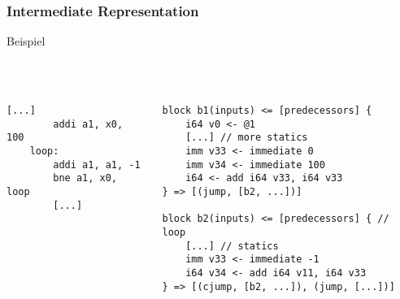 \begin{frame}[fragile]
    \frametitle{Intermediate Representation}{Beispiel}
    \pause
    ~\\
    ~\\
    ~\\
    \begin{columns}[c]
        \begin{lstlisting}[language=rv64]
        [...]
        addi a1, x0, 100
    loop:
        addi a1, a1, -1
        bne a1, x0, loop
        [...]
        \end{lstlisting}

        \pause

        \pause

        \begin{lstlisting}[language=SbtIr]
block b1(inputs) <= [predecessors] {
    i64 v0 <- @1
    [...] // more statics
    imm v33 <- immediate 0
    imm v34 <- immediate 100
    i64 <- add i64 v33, i64 v33
} => [(jump, [b2, ...])]

block b2(inputs) <= [predecessors] { // loop
    [...] // statics
    imm v33 <- immediate -1
    i64 v34 <- add i64 v11, i64 v33
} => [(cjump, [b2, ...]), (jump, [...])]
    \end{lstlisting}
    \end{columns}

\end{frame}
\clearpage


